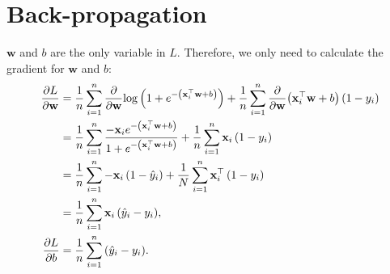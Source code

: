 \documentclass{article}
\begin{document}
\section{Back-propagation}
$\mathbf{w}$ and $b$ are the only variable in $L$. Therefore, we only need to calculate the gradient for $\mathbf{w}$ and $b$:
\begin{align}
    \frac{\partial L}{\partial\mathbf{w}} &= \frac{1}{n}\sum_{i = 1}^{n}{\frac{\partial}{\partial\mathbf{w}}{\log\left(1 + e^{-\left(\mathbf{x}^\top_i\mathbf{w} + b\right)}\right)}} + \frac{1}{n}\sum_{i = 1}^{n}{\frac{\partial}{\partial\mathbf{w}}{\left(\mathbf{x}^\top_i\mathbf{w} + b\right)\left(1 - y_i\right)}} \notag \\
    &= \frac{1}{n}\sum_{i = 1}^{n}{\frac{-\mathbf{x}_ie^{-\left(\mathbf{x}^\top_i\mathbf{w} + b\right)}}{1 + e^{-\left(\mathbf{x}^\top_i\mathbf{w} + b\right)}}} + \frac{1}{n}\sum_{i = 1}^{n}{\mathbf{x}_i\left(1 - y_i\right)} \notag \\
    &= \frac{1}{n}\sum_{i = 1}^{n}{-\mathbf{x}_i\left(1 - \hat{y}_i\right)} + \frac{1}{N}\sum_{i = 1}^{n}{\mathbf{x}_i^\top\left(1 - y_i\right)} \notag \\
    &= \frac{1}{n}\sum_{i = 1}^{n}{\mathbf{x}_i\left(\hat{y}_i - y_i\right)}, \\
    \frac{\partial L}{\partial b} &= \frac{1}{n}\sum_{i = 1}^{n}{\left(\hat{y}_i - y_i\right)}.
\end{align}
\end{document}
